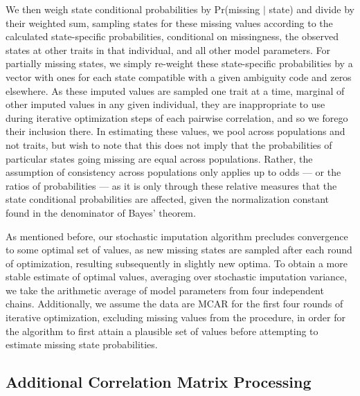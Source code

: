 \documentclass[10pt, twocolumn, twoside]{article}
\begin{document}
We then weigh state conditional probabilities by Pr(missing $\vert$ state) and divide by their weighted sum, sampling states for these missing values according to the calculated state-specific probabilities, conditional on missingness, the observed states at other traits in that individual, and all other model parameters. For partially missing states, we simply re-weight these state-specific probabilities by a vector with ones for each state compatible with a given ambiguity code and zeros elsewhere. As these imputed values are sampled one trait at a time, marginal of other imputed values in any given individual, they are inappropriate to use during iterative optimization steps of each pairwise correlation, and so we forego their inclusion there. In estimating these values, we pool across populations and not traits, but wish to note that this does not imply that the probabilities of particular states going missing are equal across populations. Rather, the assumption of consistency across populations only applies up to odds --- or the ratios of probabilities --- as it is only through these relative measures that the state conditional probabilities are affected, given the normalization constant found in the denominator of Bayes' theorem.

As mentioned before, our stochastic imputation algorithm precludes convergence to some optimal set of values, as new missing states are sampled after each round of optimization, resulting subsequently in slightly new optima. To obtain a more stable estimate of optimal values, averaging over stochastic imputation variance, we take the arithmetic average of model parameters from four independent chains. Additionally, we assume the data are MCAR for the first four rounds of iterative optimization, excluding missing values from the procedure, in order for the algorithm to first attain a plausible set of values before attempting to estimate missing state probabilities. 

\subsection{Additional Correlation Matrix Processing}
\end{document}
